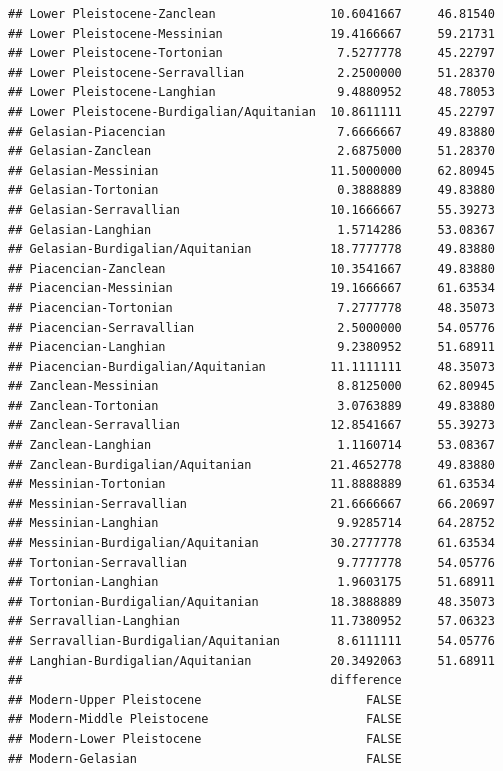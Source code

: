 \documentclass[]{article}
\begin{document}
\begin{verbatim}
## Lower Pleistocene-Zanclean                10.6041667     46.81540
## Lower Pleistocene-Messinian               19.4166667     59.21731
## Lower Pleistocene-Tortonian                7.5277778     45.22797
## Lower Pleistocene-Serravallian             2.2500000     51.28370
## Lower Pleistocene-Langhian                 9.4880952     48.78053
## Lower Pleistocene-Burdigalian/Aquitanian  10.8611111     45.22797
## Gelasian-Piacencian                        7.6666667     49.83880
## Gelasian-Zanclean                          2.6875000     51.28370
## Gelasian-Messinian                        11.5000000     62.80945
## Gelasian-Tortonian                         0.3888889     49.83880
## Gelasian-Serravallian                     10.1666667     55.39273
## Gelasian-Langhian                          1.5714286     53.08367
## Gelasian-Burdigalian/Aquitanian           18.7777778     49.83880
## Piacencian-Zanclean                       10.3541667     49.83880
## Piacencian-Messinian                      19.1666667     61.63534
## Piacencian-Tortonian                       7.2777778     48.35073
## Piacencian-Serravallian                    2.5000000     54.05776
## Piacencian-Langhian                        9.2380952     51.68911
## Piacencian-Burdigalian/Aquitanian         11.1111111     48.35073
## Zanclean-Messinian                         8.8125000     62.80945
## Zanclean-Tortonian                         3.0763889     49.83880
## Zanclean-Serravallian                     12.8541667     55.39273
## Zanclean-Langhian                          1.1160714     53.08367
## Zanclean-Burdigalian/Aquitanian           21.4652778     49.83880
## Messinian-Tortonian                       11.8888889     61.63534
## Messinian-Serravallian                    21.6666667     66.20697
## Messinian-Langhian                         9.9285714     64.28752
## Messinian-Burdigalian/Aquitanian          30.2777778     61.63534
## Tortonian-Serravallian                     9.7777778     54.05776
## Tortonian-Langhian                         1.9603175     51.68911
## Tortonian-Burdigalian/Aquitanian          18.3888889     48.35073
## Serravallian-Langhian                     11.7380952     57.06323
## Serravallian-Burdigalian/Aquitanian        8.6111111     54.05776
## Langhian-Burdigalian/Aquitanian           20.3492063     51.68911
##                                           difference
## Modern-Upper Pleistocene                       FALSE
## Modern-Middle Pleistocene                      FALSE
## Modern-Lower Pleistocene                       FALSE
## Modern-Gelasian                                FALSE

\end{verbatim}
\end{document}
